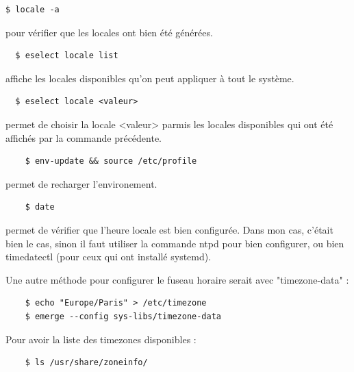 \documentclass{report}
\begin{document}
\begin{tcolorbox}
  \begin{verbatim}
$ locale -a
  \end{verbatim}
\end{tcolorbox}

pour vérifier que les locales ont bien été générées.

\begin{tcolorbox}
  \begin{verbatim}
  $ eselect locale list
  \end{verbatim}
\end{tcolorbox}

affiche les locales disponibles qu'on peut appliquer à tout le système.


\begin{tcolorbox}
  \begin{verbatim}
  $ eselect locale <valeur>
  \end{verbatim}
\end{tcolorbox}

permet de choisir la locale <valeur> parmis les locales disponibles qui ont été affichés par la commande précédente.


\begin{tcolorbox}
  \begin{verbatim}
    $ env-update && source /etc/profile
  \end{verbatim}
\end{tcolorbox}

permet de recharger l'environement.


\begin{tcolorbox}
  \begin{verbatim}
    $ date
  \end{verbatim}
\end{tcolorbox}

permet de vérifier que l'heure locale est bien configurée. Dans mon cas, c'était bien le cas, sinon il faut
utiliser la commande ntpd pour bien configurer, ou bien timedatectl (pour ceux qui ont installé systemd).

Une autre méthode pour configurer le fuseau horaire serait avec "timezone-data" :
\newpage

\begin{tcolorbox}
  \begin{verbatim}
    $ echo "Europe/Paris" > /etc/timezone
    $ emerge --config sys-libs/timezone-data
  \end{verbatim}
\end{tcolorbox}
Pour avoir la liste des timezones disponibles :
\begin{tcolorbox}
  \begin{verbatim}
    $ ls /usr/share/zoneinfo/
  \end{verbatim}
\end{tcolorbox}
\end{document}
